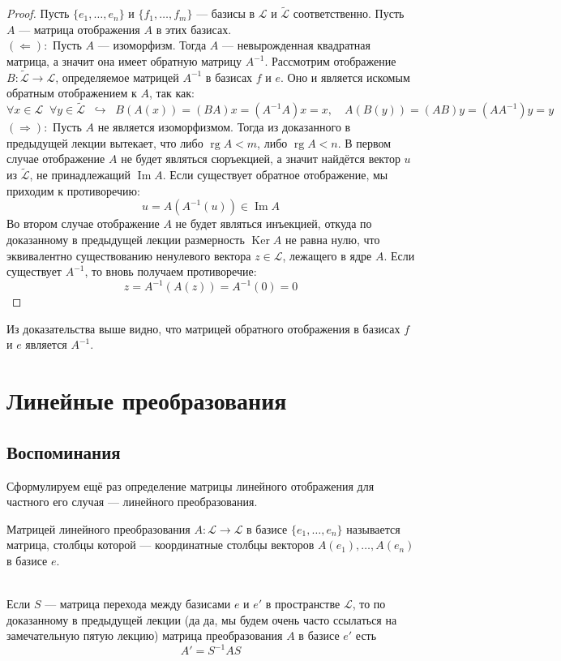 \documentclass[11pt]{article}
\DeclareMathOperator{\Imm}{Im}
\DeclareMathOperator{\Ker}{Ker}
\DeclareMathOperator{\rg}{rg}
\begin{document}
\begin{proof}
    Пусть $\{e_1, \ldots, e_n\}$ и $\{f_1, \ldots, f_m\}$ --- базисы в $\mathcal{L}$ и $\widetilde{\mathcal{L}}$ соответственно. Пусть $A$ --- матрица отображения $A$ в этих базисах.
    \\
    $(\Longleftarrow):$ Пусть $A$ --- изоморфизм. Тогда $A$ --- невырожденная квадратная матрица, а значит она имеет обратную матрицу $A^{-1}$. Рассмотрим отображение $B \colon \widetilde{\mathcal{L}} \to \mathcal{L}$, 
    определяемое матрицей $A^{-1}$ в базисах $f$ и $e$. Оно и является искомым обратным отображением к $A$, так как:
    \[\forall x \in \mathcal{L} \; \; \forall y \in \widetilde{\mathcal{L}} \; \; \hookrightarrow \; \; B(A(x)) = (BA)x = (A^{-1}A)x = x, \quad A(B(y)) = (AB)y = (A A^{-1})y = y\]
    $(\Longrightarrow):$ Пусть $A$ не является изоморфизмом. Тогда из доказанного в предыдущей лекции вытекает, что либо $\rg A < m$, либо $\rg A < n$. В первом случае отображение $A$ не будет являться сюръекцией, а значит найдётся вектор $u$ из $\widetilde{\mathcal{L}}$, не 
    принадлежащий $\Imm A$. Если существует обратное отображение, мы приходим к противоречию:
    \[u = A(A^{-1}(u)) \in \Imm A\]
    Во втором случае отображение $A$ не будет являться инъекцией, откуда по доказанному в предыдущей лекции 
    размерность $\Ker A$ не равна нулю, что эквивалентно существованию ненулевого вектора $z \in \mathcal{L}$, лежащего в ядре $A$. Если существует $A^{-1}$, то вновь получаем противоречие:
    \[z = A^{-1}(A(z)) = A^{-1}(0) = 0\]
\end{proof}

\begin{remark}
    Из доказательства выше видно, что матрицей обратного отображения в базисах $f$ и $e$ является $A^{-1}$.
\end{remark}

\section{Линейные преобразования}

\subsection{Воспоминания}

Сформулируем ещё раз определение матрицы линейного отображения для частного его случая --- линейного преобразования.

\begin{definition}
    Матрицей линейного преобразования $A \colon \mathcal{L} \to \mathcal{L}$ в базисе $\{e_1, \ldots, e_n\}$ 
    называется матрица, столбцы которой --- координатные столбцы векторов $A(e_1), \ldots, A(e_n)$ в базисе $e$.
\end{definition} \leavevmode
\\
Если $S$ --- матрица перехода между базисами $e$ и $e'$ в пространстве $\mathcal{L}$, то по доказанному в предыдущей лекции (да да, мы будем очень часто ссылаться на замечательную пятую лекцию) матрица преобразования $A$ в базисе $e'$ есть 
\[A' = S^{-1} A S\]
\end{document}
